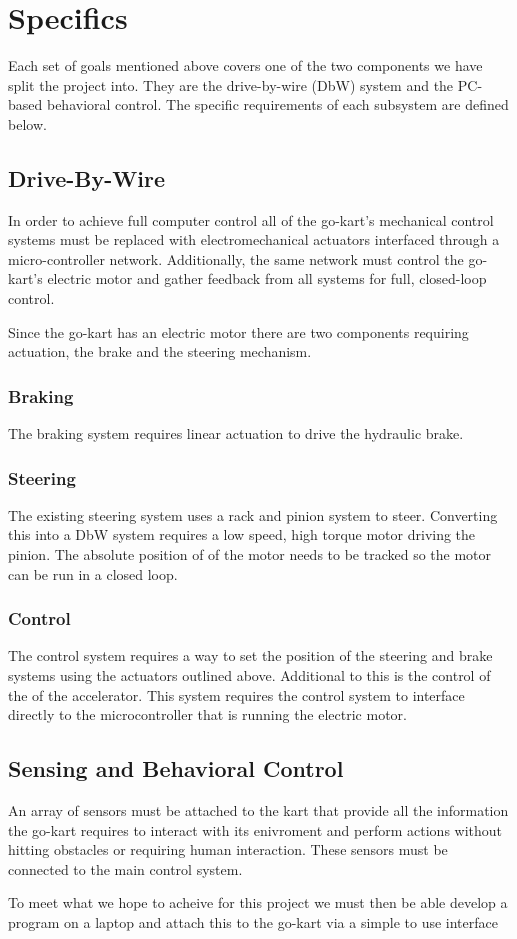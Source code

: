\section{Specifics}
Each set of goals mentioned above covers one of the two components we have split the project into. They are the drive-by-wire (DbW) system and the PC-based behavioral control. The specific requirements of each subsystem are defined below.

\subsection{Drive-By-Wire}
In order to achieve full computer control all of the go-kart's mechanical control systems must be replaced with electromechanical actuators interfaced through a micro-controller network. Additionally, the same network must control the go-kart's electric motor and gather feedback from all systems for full, closed-loop control.

Since the go-kart has an electric motor there are two components requiring actuation, the brake and the steering mechanism.

\subsubsection{Braking}
The braking system requires linear actuation to drive the hydraulic  brake. 

\subsubsection{Steering}
The existing steering system uses a rack and pinion system to steer. Converting this into a DbW system requires a low speed, high torque motor driving the pinion. The absolute position of of the motor needs to be tracked so the motor can be run in a closed loop.

\subsubsection{Control}
The control system requires a way to set the position of the steering and brake systems using the actuators outlined above. Additional to this is the control of the of the accelerator. This system requires the control system to interface directly to the microcontroller that is running the electric motor.

\subsection{Sensing and Behavioral Control}
An array of sensors must be attached to the kart that provide all the information the go-kart requires to interact with its enivroment and perform actions without hitting obstacles or requiring human interaction. These sensors must be connected to the main control system. 

To meet what we hope to acheive for this project we must then be able develop a program on a laptop and attach this to the go-kart via a simple to use interface

